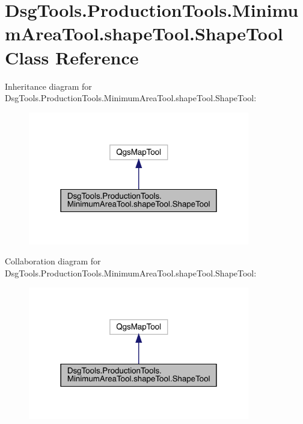 \hypertarget{class_dsg_tools_1_1_production_tools_1_1_minimum_area_tool_1_1shape_tool_1_1_shape_tool}{}\section{Dsg\+Tools.\+Production\+Tools.\+Minimum\+Area\+Tool.\+shape\+Tool.\+Shape\+Tool Class Reference}
\label{class_dsg_tools_1_1_production_tools_1_1_minimum_area_tool_1_1shape_tool_1_1_shape_tool}


Inheritance diagram for Dsg\+Tools.\+Production\+Tools.\+Minimum\+Area\+Tool.\+shape\+Tool.\+Shape\+Tool\+:
\nopagebreak
\begin{figure}[H]
\begin{center}
\leavevmode
\includegraphics[width=274pt]{class_dsg_tools_1_1_production_tools_1_1_minimum_area_tool_1_1shape_tool_1_1_shape_tool__inherit__graph}
\end{center}
\end{figure}


Collaboration diagram for Dsg\+Tools.\+Production\+Tools.\+Minimum\+Area\+Tool.\+shape\+Tool.\+Shape\+Tool\+:
\nopagebreak
\begin{figure}[H]
\begin{center}
\leavevmode
\includegraphics[width=274pt]{class_dsg_tools_1_1_production_tools_1_1_minimum_area_tool_1_1shape_tool_1_1_shape_tool__coll__graph}
\end{center}
\end{figure}
